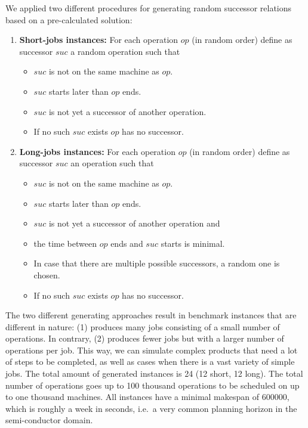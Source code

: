 \documentclass{article}
\begin{document}
We applied two different procedures for generating random successor relations based on a pre-calculated solution:
\begin{enumerate}
\item \textbf{Short-jobs instances: }For each operation $op$ (in random order) define as successor $suc$ a random operation such that
\begin{itemize}
\item $suc$ is not on the same machine as $op$.
\item $suc$ starts later than $op$ ends.
\item $suc$ is not yet a successor of another operation.
\item If no such $suc$ exists $op$ has no successor.
\end{itemize}
\item \textbf{Long-jobs instances: }For each operation $op$ (in random order) define as successor $suc$ an operation such that
\begin{itemize}
\item $suc$ is not on the same machine as $op$.
\item $suc$ starts later than $op$ ends.
\item $suc$ is not yet a successor of another operation and
\item the time between $op$ ends and $suc$ starts is minimal.
\item In case that there are multiple possible successors, a random one is chosen.
\item If no such $suc$ exists $op$ has no successor.
\end{itemize}
\end{enumerate}

The two different generating approaches result in benchmark instances that are different in nature: (1) produces many jobs consisting of a small number of operations. In contrary, (2) produces fewer jobs but with a larger number of operations per job. This way, we can simulate complex products that need a lot of steps to be completed, as well as cases when there is a vast variety of simple jobs. The total amount of generated instances is 24 (12 short, 12 long). The total number of operations goes up to 100 thousand operations to be scheduled on up to one thousand machines. All instances have a minimal makespan of 600000, which is roughly a week in seconds, i.e.\ a very common planning horizon in the semi-conductor domain.

\end{document}

